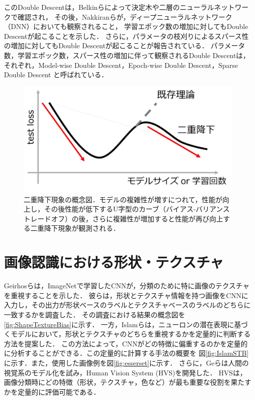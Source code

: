 このDouble Descentは，Belkinら\cite{Belkin_2019}によって決定木や二層のニューラルネットワークで確認され，
その後，Nakkiranら\cite{Nakkiran2021}が，ディープニューラルネットワーク（DNN）においても観察されること，
学習エポック数の増加に対してもDouble Descentが起こることを示した．
さらに，パラメータの枝刈りによるスパース性の増加に対してもDouble Descentが起こることが報告されている\cite{He2016-et}．
パラメータ数，学習エポック数，スパース性の増加に伴って観察されるDouble Descentは，
それぞれ，Model-wise Double Descent，Epoch-wise Double Descent，Sparse Double Descent と呼ばれている\cite{Nakkiran2021, He2016-et}．

\begin{figure}[h]
    \centering
    \includegraphics[width=\linewidth]{fig/doubledescent.pdf}
    \caption[二重降下現象の概念図]{二重降下現象の概念図．モデルの複雑性が増すにつれて，性能が向上し，その後性能が低下するU字型のカーブ（バイアス-バリアンス トレードオフ）の後，さらに複雑性が増加すると性能が再び向上する二重降下現象が観測される．}
    \label{fig:DoubleDescent}
\end{figure}

\section{画像認識における形状・テクスチャ}
Geirhosらは，ImageNetで学習したCNNが，分類のために特に画像のテクスチャを重視することを示した\cite{Geirhos}．
彼らは，形状とテクスチャ情報を持つ画像をCNNに入力し，その出力が形状ベースのラベルとテクスチャベースのラベルのどちらに一致するかを調査した．
その調査における結果の概念図を\ref{fig:ShapeTextureBias}に示す．
一方，Islamらは，ニューロンの潜在表現に基づくモデルにおいて，形状とテクスチャのどちらを重視するかを定量的に判断する方法を提案した\cite{islam2021shape}．
この方法によって，CNNがどの特徴に偏重するのかを定量的に分析することができる．この定量的に計算する手法の概要を
図\ref{fig:IslamSTB}に示す．また，使用した画像例を図\ref{fig:esserset}に示す．
さらに，Geらは人間の視覚系のモデル化を試み，Human Vision System (HVS)を開発した．
HVSは，画像分類時にどの特徴（形状，テクスチャ，色など）が最も重要な役割を果たすかを定量的に評価可能である\cite{Ge}．

